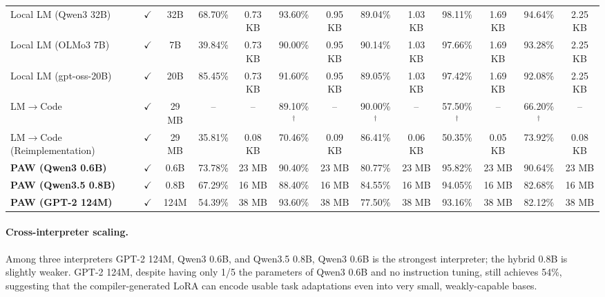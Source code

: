 \documentclass{article}
\theoremstyle{plain}
\theoremstyle{definition}
\theoremstyle{remark}
\begin{document}
\begin{table}[!t]
{\begin{tabular}{@{}l@{}c@{ }c cc cc cc cc cc@{}}
Local LM (Qwen3 32B)                      & $\checkmark$ & 32B  & 68.70\% & 0.73 KB & 93.60\%     & 0.95 KB & 89.04\%     & 1.03 KB & 98.11\%     & 1.69 KB & 94.64\%     & 2.25 KB \\
Local LM (OLMo3 7B)                       & $\checkmark$ & 7B   & 39.84\%     & 0.73 KB & 90.00\% & 0.95 KB & 90.14\% & 1.03 KB & 97.66\% & 1.69 KB & 93.28\% & 2.25 KB \\
Local LM (gpt-oss-20B)        & $\checkmark$ & 20B  & 85.45\% & 0.73 KB & 91.60\%     & 0.95 KB & 89.05\%     & 1.03 KB & 97.42\%     & 1.69 KB & 92.08\%     & 2.25 KB \\
LM$\to$Code~\citep{NEURIPS2024_72802bef}  & $\checkmark$ & 29 MB & --     & --      & 89.10\%$^\dagger$ & -- & 90.00\%$^\dagger$ & -- & 57.50\%$^\dagger$ & -- & 66.20\%$^\dagger$ & -- \\
LM$\to$Code (Reimplementation)            & $\checkmark$ & 29 MB & 35.81\% & 0.08 KB & 70.46\% & 0.09 KB & 86.41\% & 0.06 KB & 50.35\% & 0.05 KB & 73.92\% & 0.08 KB \\
\midrule
\textbf{PAW (Qwen3 0.6B)}                  & $\checkmark$ & 0.6B  & {73.78\%} & 23 MB & 90.40\% & 23 MB & 80.77\% & 23 MB & 95.82\% & 23 MB & 90.64\% & 23 MB \\
\textbf{PAW (Qwen3.5 0.8B)}                & $\checkmark$ & 0.8B  & 67.29\% & 16 MB & 88.40\% & 16 MB & 84.55\% & 16 MB & 94.05\% & 16 MB & 82.68\% & 16 MB \\
\textbf{PAW (GPT-2 124M)}                  & $\checkmark$ & 124M  & 54.39\% & 38 MB & 93.60\% & 38 MB & 77.50\% & 38 MB & 93.16\% & 38 MB & 82.12\% & 38 MB \\
\bottomrule
\end{tabular}}
\end{table}

\paragraph{Cross-interpreter scaling.}
Among three interpreters GPT-2 124M, Qwen3 0.6B, and Qwen3.5 0.8B, Qwen3 0.6B is the strongest interpreter; the hybrid 0.8B is slightly weaker. GPT-2 124M, despite having only 1/5 the parameters of Qwen3 0.6B and no instruction tuning, still achieves 54\%, suggesting that the compiler-generated LoRA can encode usable task adaptations even into very small, weakly-capable bases. %
\end{document}
